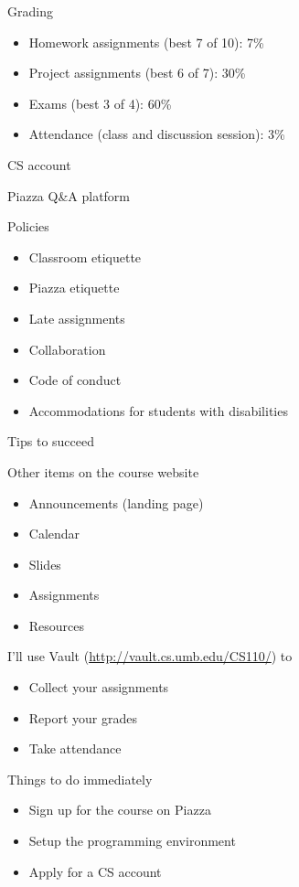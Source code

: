 \documentclass[8pt,a4paper,compress]{beamer}
\begin{document}
\begin{frame}[fragile]
Grading
\begin{itemize}
\item Homework assignments (best 7 of 10): 7\%
\item Project assignments (best 6 of 7): 30\%
\item Exams (best 3 of 4): 60\%
\item Attendance (class and discussion session): 3\%
\end{itemize}

\bigskip

CS account

\bigskip

Piazza Q\&A platform

\bigskip

Policies
\begin{itemize}
\item Classroom etiquette
\item Piazza etiquette
\item Late assignments
\item Collaboration
\item Code of conduct
\item Accommodations for students with disabilities
\end{itemize}
\end{frame}

\begin{frame}[fragile]
Tips to succeed

\bigskip

Other items on the course website
\begin{itemize}
\item Announcements (landing page)
\item Calendar
\item Slides 
\item Assignments
\item Resources
\end{itemize}

\bigskip

I'll use Vault (\href{http://vault.cs.umb.edu/CS110/}{http://vault.cs.umb.edu/CS110/}) to
\begin{itemize}
\item Collect your assignments
\item Report your grades
\item Take attendance
\end{itemize}

\bigskip

Things to do immediately
\begin{itemize}
\item Sign up for the course on Piazza
\item Setup the programming environment
\item Apply for a CS account
\end{itemize}
\end{frame}
\end{document}
